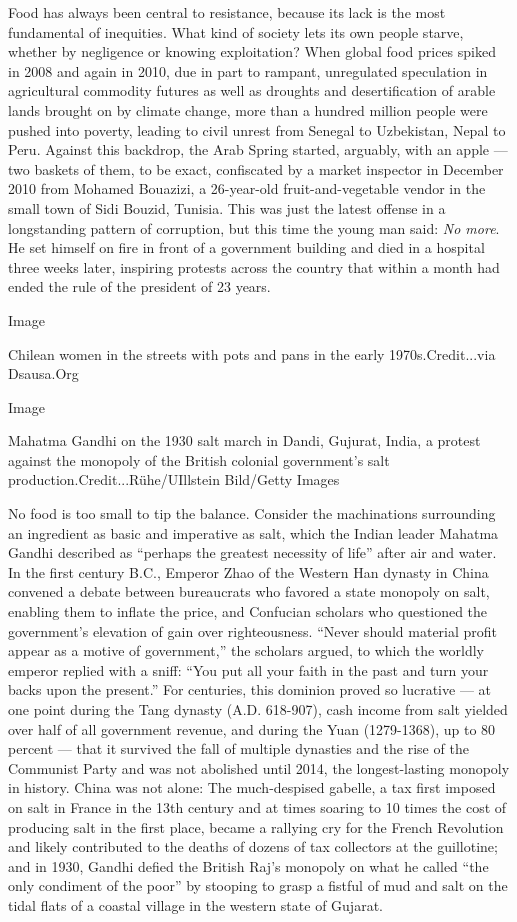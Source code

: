 Food has always been central to resistance, because its lack is the most
fundamental of inequities. What kind of society lets its own people
starve, whether by negligence or knowing exploitation? When global food
prices spiked in 2008 and again in 2010, due in part to rampant,
unregulated speculation in agricultural commodity futures as well as
droughts and desertification of arable lands brought on by climate
change, more than a hundred million people were pushed into poverty,
leading to civil unrest from Senegal to Uzbekistan, Nepal to Peru.
Against this backdrop, the Arab Spring started, arguably, with an apple
--- two baskets of them, to be exact, confiscated by a market inspector
in December 2010 from Mohamed Bouazizi, a 26-year-old
fruit-and-vegetable vendor in the small town of Sidi Bouzid, Tunisia.
This was just the latest offense in a longstanding pattern of
corruption, but this time the young man said: \emph{No more}. He set
himself on fire in front of a government building and died in a hospital
three weeks later, inspiring protests across the country that within a
month had ended the rule of the president of 23 years.

Image

Chilean women in the streets with pots and pans in the early
1970s.Credit...via Dsausa.Org

Image

Mahatma Gandhi on the 1930 salt march in Dandi, Gujurat, India, a
protest against the monopoly of the British colonial government's salt
production.Credit...Rühe/UIllstein Bild/Getty Images

No food is too small to tip the balance. Consider the machinations
surrounding an ingredient as basic and imperative as salt, which the
Indian leader Mahatma Gandhi described as ``perhaps the greatest
necessity of life'' after air and water. In the first century B.C.,
Emperor Zhao of the Western Han dynasty in China convened a debate
between bureaucrats who favored a state monopoly on salt, enabling them
to inflate the price, and Confucian scholars who questioned the
government's elevation of gain over righteousness. ``Never should
material profit appear as a motive of government,'' the scholars argued,
to which the worldly emperor replied with a sniff: ``You put all your
faith in the past and turn your backs upon the present.'' For centuries,
this dominion proved so lucrative --- at one point during the Tang
dynasty (A.D. 618-907), cash income from salt yielded over half of all
government revenue, and during the Yuan (1279-1368), up to 80 percent
--- that it survived the fall of multiple dynasties and the rise of the
Communist Party and was not abolished until 2014, the longest-lasting
monopoly in history. China was not alone: The much-despised gabelle, a
tax first imposed on salt in France in the 13th century and at times
soaring to 10 times the cost of producing salt in the first place,
became a rallying cry for the French Revolution and likely contributed
to the deaths of dozens of tax collectors at the guillotine; and in
1930, Gandhi defied the British Raj's monopoly on what he called ``the
only condiment of the poor'' by stooping to grasp a fistful of mud and
salt on the tidal flats of a coastal village in the western state of
Gujarat.

